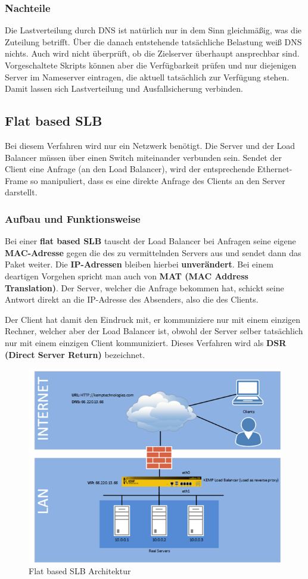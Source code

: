 \subsubsection{Nachteile}
Die Lastverteilung durch DNS ist natürlich nur in dem Sinn gleichmäßig, was die Zuteilung betrifft. Über die danach entstehende tatsächliche Belastung weiß DNS nichts. Auch wird nicht überprüft, ob die Zielserver überhaupt ansprechbar sind. Vorgeschaltete Skripts können aber die Verfügbarkeit prüfen und nur diejenigen Server im Nameserver eintragen, die aktuell tatsächlich zur Verfügung stehen. Damit lassen sich Lastverteilung und Ausfallsicherung verbinden.


\newpage

\subsection{Flat based SLB}
\label{FlatSLB}
Bei diesem Verfahren wird nur ein Netzwerk benötigt. Die Server und der Load Balancer müssen über einen Switch miteinander verbunden sein. Sendet der Client eine Anfrage (an den Load Balancer), wird der entsprechende Ethernet-Frame so manipuliert, dass es eine direkte Anfrage des Clients an den Server darstellt.

\subsubsection{Aufbau und Funktionsweise}
Bei einer \textbf{flat based SLB}  tauscht der Load Balancer bei Anfragen seine eigene \textbf{MAC-Adresse} gegen die des zu vermittelnden Servers aus und sendet dann das Paket weiter. Die \textbf{IP-Adressen} bleiben hierbei \textbf{unverändert}. Bei einem deartigen Vorgehen spricht man auch von \textbf{MAT (MAC Address Translation)}. Der Server, welcher die Anfrage bekommen hat, schickt seine Antwort direkt an die IP-Adresse des Absenders, also die des Clients.

Der Client hat damit den Eindruck mit, er kommuniziere nur mit einem einzigen Rechner, welcher aber der Load Balancer ist, obwohl der Server selber tatsächlich nur mit einem einzigen Client kommuniziert. Dieses Verfahren wird als \textbf{DSR (Direct Server Return)} bezeichnet.

\begin{figure}[!h]
	\begin{center}
		\includegraphics[width=0.5\linewidth]{images/flat_slb}
		\caption{Flat based SLB Architektur }
		\label{flat_based_SLB}
	\end{center}
\end{figure}

